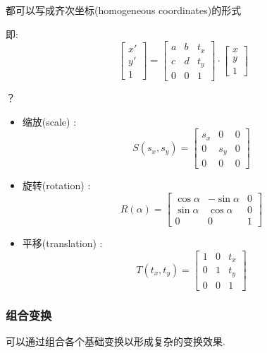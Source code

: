 \documentclass[UTF8,12pt]{ctexbook}
\begin{document}
{{{{{        都可以写成齐次坐标(homogeneous coordinates)的形式

        即:
        $$\begin{bmatrix}
            x\prime \\
            y\prime \\
            1
          \end{bmatrix}
          =
          \begin{bmatrix}
            a & b & t_x \\
            c & d & t_y \\
            0 & 0 & 1
          \end{bmatrix}
          \cdot
          \begin{bmatrix}
            x \\
            y \\
            1
          \end{bmatrix}$$

        {？}
        \begin{itemize}
          \item 缩放(scale) : $$S(s_x, s_y) = \begin{bmatrix}
                    s_x & 0   & 0 \\
                    0   & s_y & 0 \\
                    0   & 0   & 0
                  \end{bmatrix}$$
          \item 旋转(rotation) : $$R(\alpha) = \begin{bmatrix}
                    \cos\alpha & -\sin\alpha & 0 \\
                    \sin\alpha & \cos\alpha  & 0 \\
                    0          & 0           & 1
                  \end{bmatrix}$$
          \item 平移(translation) : $$T(t_x, t_y) = \begin{bmatrix}
                    1 & 0 & t_x \\
                    0 & 1 & t_y \\
                    0 & 0 & 1
                  \end{bmatrix}$$
        \end{itemize}

      }%

      \subsubsection{组合变换}{
        可以通过组合各个基础变换以形成复杂的变换效果.

}}}}}
\end{document}
